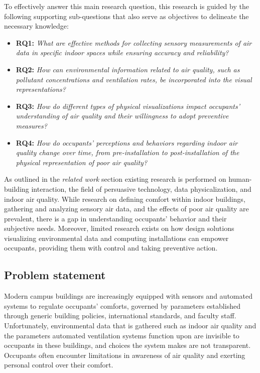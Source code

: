 To effectively answer this main research question, this research is guided by the following supporting sub-questions that also serve as objectives to delineate the necessary knowledge:

\begin{itemize}
    \item \textbf{RQ1:} \emph{What are effective methods for collecting sensory measurements of air data in specific indoor spaces while ensuring accuracy and reliability?}
    \item \textbf{RQ2:} \emph{How can environmental information related to air quality, such as pollutant concentrations and ventilation rates, be incorporated into the visual representations?}
    \item \textbf{RQ3:} \emph{How do different types of physical visualizations impact occupants' understanding of air quality and their willingness to adopt preventive measures?}
    \item \textbf{RQ4:} \emph{How do occupants' perceptions and behaviors regarding indoor air quality change over time, from pre-installation to post-installation of the physical representation of poor air quality?}\\
\end{itemize}

As outlined in the \emph{related work} section existing research is performed on human-building interaction, the field of persuasive technology, data physicalization, and indoor air quality. While research on defining comfort within indoor buildings, gathering and analyzing sensory air data, and the effects of poor air quality are prevalent, there is a gap in understanding occupants' behavior and their subjective needs. Moreover, limited research exists on how design solutions visualizing environmental data and computing installations can empower occupants, providing them with control and taking preventive action.

\subsection{Problem statement}

Modern campus buildings are increasingly equipped with sensors and automated systems to regulate occupants' comforts, governed by parameters established through generic building policies, international standards, and faculty staff. Unfortunately, environmental data that is gathered such as indoor air quality and the parameters automated ventilation systems function upon are invisible to occupants in these buildings, and choices the system makes are not transparent. Occupants often encounter limitations in awareness of air quality and exerting personal control over their comfort.


